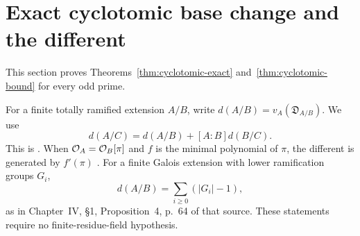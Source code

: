 \section{Exact cyclotomic base change and the different}\label{sec:different}
This section proves Theorems~\ref{thm:cyclotomic-exact} and~\ref{thm:cyclotomic-bound} for every odd prime.

For a finite totally ramified extension $A/B$, write
$d(A/B)=v_A(\mathfrak D_{A/B})$. We use
\begin{equation}\label{eq:different-tower}
 d(A/C)=d(A/B)+[A:B]d(B/C).
\end{equation}
This is \citet[Chapter~III, \S4, Proposition~8, p.~51]{Serre1979}. When $\mathcal O_A=\mathcal O_B[\pi]$ and $f$ is the minimal polynomial of $\pi$, the different is generated by $f'(\pi)$ \citep[Chapter~III, \S6, Proposition~11 and Corollary~2, pp.~55--57]{Serre1979}. For a finite Galois extension with lower ramification groups $G_i$,
\begin{equation}\label{eq:different-lower}
 d(A/B)=\sum_{i\ge0}(|G_i|-1),
\end{equation}
as in Chapter~IV, \S1, Proposition~4, p.~64 of that source. These statements require no finite-residue-field hypothesis.

